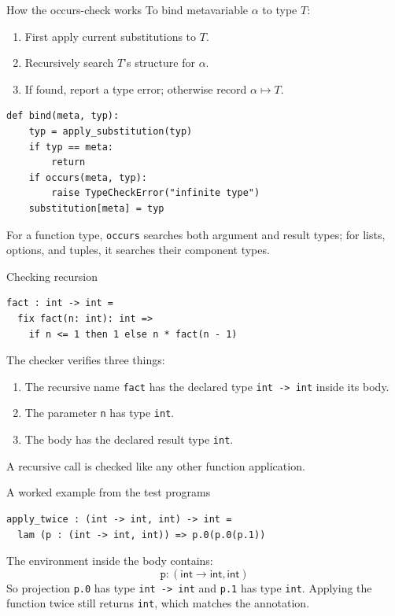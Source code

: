\documentclass[aspectratio=169,11pt]{beamer}
\newcommand{\Int}{\mathsf{int}}
\begin{document}
\begin{frame}[fragile]{How the occurs-check works}
To bind metavariable $\alpha$ to type $T$:
\begin{enumerate}
  \item First apply current substitutions to $T$.
  \item Recursively search $T$'s structure for $\alpha$.
  \item If found, report a type error; otherwise record $\alpha\mapsto T$.
\end{enumerate}
\begin{lstlisting}
def bind(meta, typ):
    typ = apply_substitution(typ)
    if typ == meta:
        return
    if occurs(meta, typ):
        raise TypeCheckError("infinite type")
    substitution[meta] = typ
\end{lstlisting}
For a function type, \texttt{occurs} searches both argument and result types; for lists, options, and tuples, it searches their component types.
\end{frame}

\begin{frame}[fragile]{Checking recursion}
\begin{lstlisting}
fact : int -> int =
  fix fact(n: int): int =>
    if n <= 1 then 1 else n * fact(n - 1)
\end{lstlisting}
The checker verifies three things:
\begin{enumerate}
  \item The recursive name \texttt{fact} has the declared type \texttt{int -> int} inside its body.
  \item The parameter \texttt{n} has type \texttt{int}.
  \item The body has the declared result type \texttt{int}.
\end{enumerate}
A recursive call is checked like any other function application.
\end{frame}

\begin{frame}[fragile]{A worked example from the test programs}
\begin{lstlisting}
apply_twice : (int -> int, int) -> int =
  lam (p : (int -> int, int)) => p.0(p.0(p.1))
\end{lstlisting}
The environment inside the body contains:
\[
\texttt{p}:(\Int\to\Int,\Int)
\]
So projection \texttt{p.0} has type \texttt{int -> int} and \texttt{p.1} has type \texttt{int}. Applying the function twice still returns \texttt{int}, which matches the annotation.
\end{frame}
\end{document}
